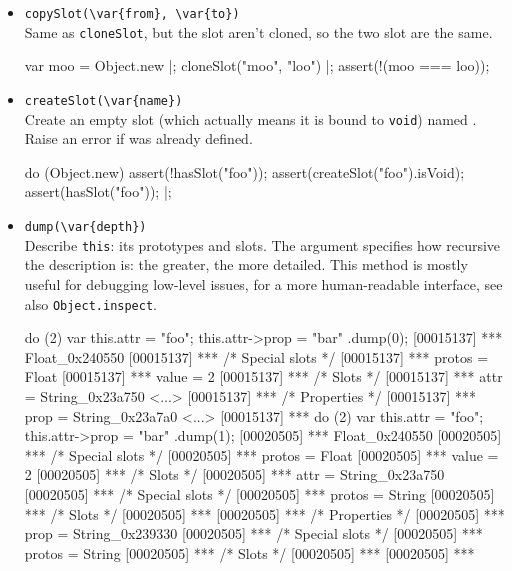 \begin{itemize}
\item \lstinline|copySlot(\var{from}, \var{to})|\\
  Same as \lstinline|cloneSlot|, but the slot aren't cloned, so the
  two slot are the same.

\begin{urbiscript}
var moo = Object.new |;
cloneSlot("moo", "loo") |;
assert(!(moo === loo));
\end{urbiscript}

\item \lstinline|createSlot(\var{name})|\\
  Create an empty slot (which actually means it is bound to
  \lstinline|void|) named .  Raise an error if 
  was already defined.
\begin{urbiscript}
do (Object.new)
{
  assert(!hasSlot("foo"));
  assert(createSlot("foo").isVoid);
  assert(hasSlot("foo"));
}|;
\end{urbiscript}

\item \lstinline|dump(\var{depth})|\\
  Describe \lstinline|this|: its prototypes and slots.  The argument
   specifies how recursive the description is: the greater,
  the more detailed.  This method is mostly useful for debugging
  low-level issues, for a more human-readable interface, see also
  \lstinline|Object.inspect|.
\begin{urbiscript}
do (2) { var this.attr = "foo"; this.attr->prop = "bar" }.dump(0);
[00015137] *** Float_0x240550 {
[00015137] ***   /* Special slots */
[00015137] ***   protos = Float
[00015137] ***   value = 2
[00015137] ***   /* Slots */
[00015137] ***   attr = String_0x23a750 <...>
[00015137] ***     /* Properties */
[00015137] ***     prop = String_0x23a7a0 <...>
[00015137] ***   }
do (2) { var this.attr = "foo"; this.attr->prop = "bar" }.dump(1);
[00020505] *** Float_0x240550 {
[00020505] ***   /* Special slots */
[00020505] ***   protos = Float
[00020505] ***   value = 2
[00020505] ***   /* Slots */
[00020505] ***   attr = String_0x23a750 {
[00020505] ***     /* Special slots */
[00020505] ***     protos = String
[00020505] ***     /* Slots */
[00020505] ***     }
[00020505] ***     /* Properties */
[00020505] ***     prop = String_0x239330 {
[00020505] ***       /* Special slots */
[00020505] ***       protos = String
[00020505] ***       /* Slots */
[00020505] ***       }
[00020505] ***   }
\end{urbiscript}


\end{itemize}
